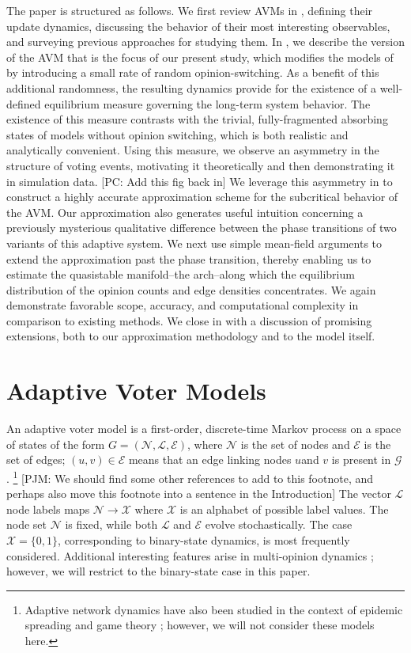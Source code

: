 \documentclass[review, onefignum, onetabnum]{siamart171218}
\newcommand{\pjm}[1]{{\color{blue}[PJM: #1]}}
\newcommand{\pc}[1]{{\color{comment_purple}[PC: #1]}}
\begin{document}
	The paper is structured as follows. 
	We first review AVMs in , defining their update dynamics, discussing the behavior of their most interesting observables, and surveying previous approaches for studying them. 
	In , we describe the version of the AVM that is the focus of our present study, which modifies the models of \cite{Durrett2012} by introducing a small rate of random opinion-switching. 
	As a benefit of this additional randomness, the resulting dynamics provide for the existence of a well-defined equilibrium measure governing the long-term system behavior. 
	The existence of this measure contrasts with the trivial, fully-fragmented absorbing states of models without opinion switching, which is both realistic and analytically convenient. 
	Using this measure, we observe an asymmetry in the structure of voting events, motivating it theoretically and then demonstrating it in simulation data. \pc{Add this fig back in} 
	We leverage this asymmetry in  to construct a highly accurate approximation scheme for the subcritical behavior of the AVM. 
	Our approximation also generates useful intuition concerning a previously mysterious qualitative difference between the phase transitions of two variants of this adaptive system.
	We next use simple mean-field arguments to extend the approximation past the phase transition, thereby enabling us to estimate the quasistable manifold--the arch--along which the equilibrium distribution of the opinion counts and edge densities concentrates.
	We again demonstrate favorable scope, accuracy, and computational complexity in comparison to existing methods.
	We close in  with a discussion of promising extensions, both to our approximation methodology and to the model itself. 
	
\section{Adaptive Voter Models} \label{sec:AVMs}
	
	An adaptive voter model is a first-order, discrete-time Markov process on a space of states of the form $G = (\mathcal{N}, \mathcal{L}, \mathcal{E})$, where $\mathcal{N}$ is the set of nodes and $\mathcal{E}$ is the set of edges; $(u,v) \in \mathcal{E}$ means that an edge linking nodes $u$and $v$ is present in $\mathcal{G}$.
	\footnote{Adaptive network dynamics have also been studied in the context of epidemic spreading \cite{Marceau2010,Lee2017} and game theory \cite{Malik2016}; however, we will not consider these models here.} \pjm{We should find some other references to add to this footnote, and perhaps also move this footnote into a sentence in the Introduction} 
    The vector $\mathcal{L}$  node labels maps $\mathcal{N} \rightarrow \mathcal{X}$ where $\mathcal{X}$ is an alphabet of possible label values. 
	The node set $\mathcal{N}$ is fixed, while both $\mathcal{L}$ and $\mathcal{E}$ evolve stochastically.
	The case $\mathcal{X} = \{0,1\}$, corresponding to binary-state dynamics, is most frequently considered. 
	Additional interesting features arise in multi-opinion dynamics \cite{Holme2006, Shi2013}; however, we will restrict to the binary-state case in this paper. 
	
\end{document}
